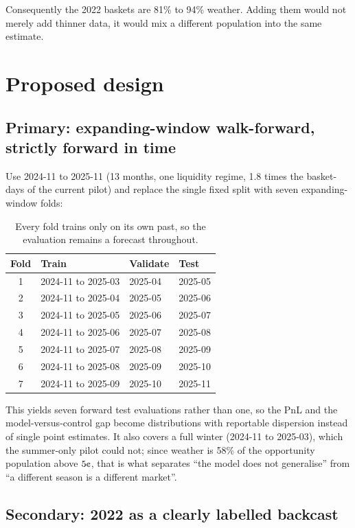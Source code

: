 \documentclass[11pt,a4paper]{article}
\newcommand{\cent}{\text{\textcent}}
\begin{document}
Consequently the 2022 baskets are 81\% to 94\% weather. Adding them would not
merely add thinner data, it would mix a different population into the same
estimate.

\section{Proposed design}

\subsection{Primary: expanding-window walk-forward, strictly forward in time}

Use 2024-11 to 2025-11 (13 months, one liquidity regime, 1.8 times the
basket-days of the current pilot) and replace the single fixed split with
seven expanding-window folds:

\begin{table}[ht]
\centering
\begin{tabular}{clll}
\toprule
Fold & Train & Validate & Test \\
\midrule
1 & 2024-11 to 2025-03 & 2025-04 & 2025-05 \\
2 & 2024-11 to 2025-04 & 2025-05 & 2025-06 \\
3 & 2024-11 to 2025-05 & 2025-06 & 2025-07 \\
4 & 2024-11 to 2025-06 & 2025-07 & 2025-08 \\
5 & 2024-11 to 2025-07 & 2025-08 & 2025-09 \\
6 & 2024-11 to 2025-08 & 2025-09 & 2025-10 \\
7 & 2024-11 to 2025-09 & 2025-10 & 2025-11 \\
\bottomrule
\end{tabular}
\caption{Every fold trains only on its own past, so the evaluation remains a
forecast throughout.}
\end{table}

This yields seven forward test evaluations rather than one, so the PnL and the
model-versus-control gap become distributions with reportable dispersion
instead of single point estimates. It also covers a full winter (2024-11 to
2025-03), which the summer-only pilot could not; since weather is 58\% of the
opportunity population above $5\cent$, that is what separates ``the model does
not generalise'' from ``a different season is a different market''.

\subsection{Secondary: 2022 as a clearly labelled backcast}
\end{document}

